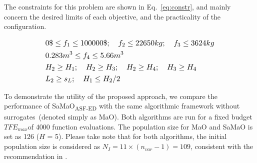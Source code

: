 \documentclass[twocolumn,10pt]{asme2ej}
\begin{document}
The constraints for this problem are shown in Eq.~\ref{eq:constr}, and mainly concern the desired limits of each objective, and the practicality of the configuration. 

\begin{equation}\footnotesize
\begin{aligned}
& 0 \$ \le f_1 \le 100000 \$; \quad f_2 \le 22650 kg; \quad f_3 \le 3624 kg \\
& 0.283 m^3 \le f_4 \le 5.66 m^3 \\
& H_2 \ge H_1; \quad H_2 \ge H_3; \quad H_2 \ge H_4; \quad H_3 \ge H_4 \\ 
&L_2 \ge s_L; \quad H_1 \le H_2/2 \\
\end{aligned}
\label{eq:constr}
\end{equation}

To demonstrate the utility of the proposed approach, we compare the performance of SaMaO\textsubscript{ASF-ED} with the same algorithmic framework without surrogates~(denoted simply as MaO). Both algorithms {\color{blue}are run for} a fixed budget $TFE_{max} $of 4000 function evaluations. The population size for MaO and SaMaO is set as 126 ($H$ = 5). {\color{blue}Please take note that for both algorithms, the initial population size is considered as $N_I = 11 \times (n_{var} - 1) = 109$, consistent with the recommendation in \cite{KHTchugh2016krvea}}. 
\end{document}
